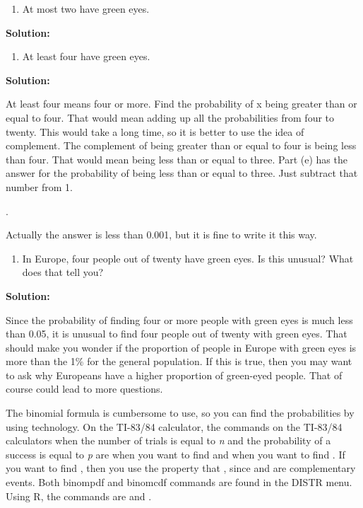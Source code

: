 \documentclass[]{book}
\providecommand{\tightlist}{%
  \setlength{\itemsep}{0pt}\setlength{\parskip}{0pt}}
\begin{document}
\begin{enumerate}
\def\labelenumi{\alph{enumi}.}
\setcounter{enumi}{5}
\tightlist
\item
  At most two have green eyes.
\end{enumerate}

\textbf{Solution:}

\begin{enumerate}
\def\labelenumi{\alph{enumi}.}
\setcounter{enumi}{6}
\tightlist
\item
  At least four have green eyes.
\end{enumerate}

\textbf{Solution:}

At least four means four or more. Find the probability of x being
greater than or equal to four. That would mean adding up all the
probabilities from four to twenty. This would take a long time, so it is
better to use the idea of complement. The complement of being greater
than or equal to four is being less than four. That would mean being
less than or equal to three. Part (e) has the answer for the probability
of being less than or equal to three. Just subtract that number from 1.

.

Actually the answer is less than 0.001, but it is fine to write it this
way.

\begin{enumerate}
\def\labelenumi{\alph{enumi}.}
\setcounter{enumi}{7}
\tightlist
\item
  In Europe, four people out of twenty have green eyes. Is this
  unusual? What does that tell you?
\end{enumerate}

\textbf{Solution:}

Since the probability of finding four or more people with green eyes is
much less than 0.05, it is unusual to find four people out of twenty
with green eyes. That should make you wonder if the proportion of people
in Europe with green eyes is more than the 1\% for the general
population. If this is true, then you may want to ask why Europeans have
a higher proportion of green-eyed people. That of course could lead to
more questions.

The binomial formula is cumbersome to use, so you can find the
probabilities by using technology. On the TI-83/84 calculator, the
commands on the TI-83/84 calculators when the number of trials is equal
to \emph{n} and the probability of a success is equal to \emph{p} are when you
want to find and when you want to find . If you want to find , then you
use the property that , since and are complementary events. Both
binompdf and binomcdf commands are found in the DISTR menu. Using R, the
commands are and .
\end{document}
